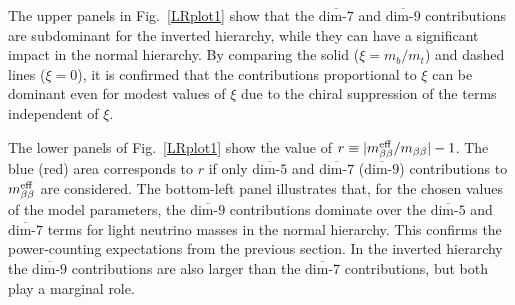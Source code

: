 \documentclass[letterpaper,11pt]{article}
\newcommand{\bt}{\beta}
\newcommand{\textoverline}[1]{$\overline{\mbox{#1}}$}
\begin{document}
The upper panels in Fig.\ \ref{LRplot1} show that the \textoverline{dim-7} and \textoverline{dim-9} contributions are subdominant for the inverted hierarchy, while they can have a significant impact in the normal hierarchy. By comparing the solid ($\xi=m_b/m_t$) and dashed lines ($\xi=0$), it is confirmed that the contributions proportional to $\xi$ can be dominant even for modest values of $\xi$ due to the chiral suppression of the terms independent of $\xi$.

The lower panels of Fig.\ \ref{LRplot1} show the value of $r\equiv|m_{\bt\bt}^{\rm eff}/m_{\bt\bt}|-1$. The blue (red) area corresponds to $r$ if only  \textoverline{dim-5} and \textoverline{dim-7} (\textoverline{dim-9}) contributions to $m_{\bt\bt}^{\rm eff}$ are considered. The bottom-left panel illustrates that, for the chosen values of the model parameters, the  \textoverline{dim-9} contributions dominate over the \textoverline{dim-5} and \textoverline{dim-7} terms for light neutrino masses in the normal hierarchy. This confirms the power-counting expectations from the previous section. In the inverted hierarchy the \textoverline{dim-9} contributions are also larger than the \textoverline{dim-7} contributions, but both play a marginal role.
\end{document}
